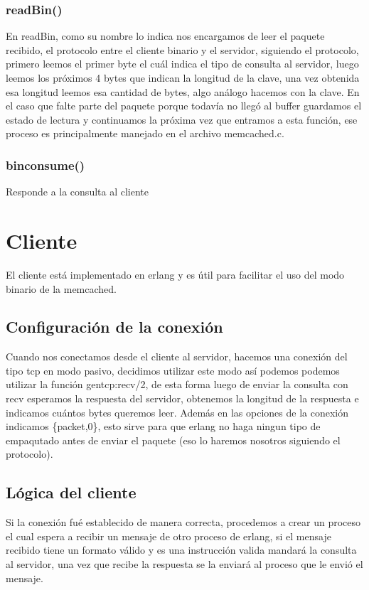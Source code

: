 \documentclass{article}
\begin{document}
\subsubsection{readBin()}
En readBin, como su nombre lo indica nos encargamos de leer
el paquete recibido, el protocolo entre el cliente binario
y el servidor, siguiendo el protocolo, primero leemos el primer
byte el cuál indica el tipo de consulta al servidor, luego
leemos los próximos 4 bytes que indican la longitud de la clave,
una vez obtenida esa longitud leemos esa cantidad de bytes, algo
análogo hacemos con la clave. En el caso que falte parte del
paquete porque todavía no llegó al buffer guardamos el estado
de lectura y continuamos la próxima vez que entramos a esta
función, ese proceso es principalmente manejado en el archivo
memcached.c.

\subsubsection{bin\textunderscore consume()}
Responde a la consulta al cliente

\section{Cliente}
El cliente está implementado en erlang y es útil para facilitar el uso del modo binario de la memcached.

\subsection{Configuración de la conexión}
Cuando nos conectamos desde el cliente al servidor,
hacemos una conexión del tipo tcp en modo pasivo,
decidimos utilizar este modo así podemos podemos
utilizar la función gen\textunderscore tcp:recv/2,
de esta forma luego de enviar la consulta con recv
esperamos la respuesta del servidor, obtenemos
la longitud de la respuesta e indicamos cuántos
bytes queremos leer. Además en las opciones
de la conexión indicamos \{packet,0\}, esto sirve
para que erlang no haga ningun tipo de empaqutado
antes de enviar el paquete (eso lo haremos nosotros
siguiendo el protocolo).

\subsection{Lógica del cliente}
Si la conexión fué establecido de manera
correcta, procedemos a crear un proceso el
cual espera a recibir un mensaje de otro proceso
de erlang, si el mensaje recibido tiene un formato
válido y es una instrucción valida mandará la consulta
al servidor, una vez que recibe la respuesta se la
enviará al proceso que le envió el mensaje.
\end{document}

